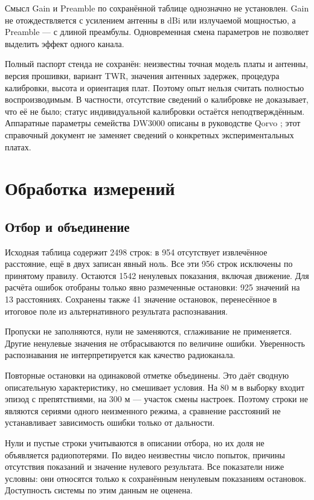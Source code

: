 \documentclass{misisarticle}
\begin{document}
Смысл Gain и Preamble по сохранённой таблице однозначно не установлен. Gain не отождествляется с усилением антенны в dBi или излучаемой мощностью, а Preamble --- с длиной преамбулы. Одновременная смена параметров не позволяет выделить эффект одного канала.

Полный паспорт стенда не сохранён: неизвестны точная модель платы и антенны, версия прошивки, вариант TWR, значения антенных задержек, процедура калибровки, высота и ориентация плат. Поэтому опыт нельзя считать полностью воспроизводимым. В частности, отсутствие сведений о калибровке не доказывает, что её не было; статус индивидуальной калибровки остаётся неподтверждённым. Аппаратные параметры семейства DW3000 описаны в руководстве Qorvo \cite{aph301}; этот справочный документ не заменяет сведений о конкретных экспериментальных платах.

\section{Обработка измерений}

\subsection{Отбор и объединение}

Исходная таблица содержит 2498 строк: в 954 отсутствует извлечённое расстояние, ещё в двух записан явный ноль. Все эти 956 строк исключены по принятому правилу. Остаются 1542 ненулевых показания, включая движение. Для расчёта ошибок отобраны только явно размеченные остановки: 925 значений на 13 расстояниях. Сохранены также 41 значение остановок, перенесённое в итоговое поле из альтернативного результата распознавания.

Пропуски не заполняются, нули не заменяются, сглаживание не применяется. Другие ненулевые значения не отбрасываются по величине ошибки. Уверенность распознавания не интерпретируется как качество радиоканала.

Повторные остановки на одинаковой отметке объединены. Это даёт сводную описательную характеристику, но смешивает условия. На 80 м в выборку входит эпизод с препятствиями, на 300 м --- участок смены настроек. Поэтому строки не являются сериями одного неизменного режима, а сравнение расстояний не устанавливает зависимость ошибки только от дальности.

Нули и пустые строки учитываются в описании отбора, но их доля не объявляется радиопотерями. По видео неизвестны число попыток, причины отсутствия показаний и значение нулевого результата. Все показатели ниже условны: они относятся только к сохранённым ненулевым показаниям остановок. Доступность системы по этим данным не оценена.
\end{document}
